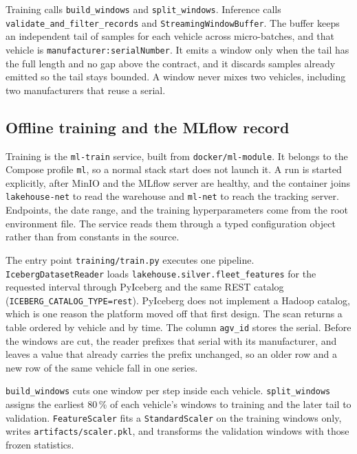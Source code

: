 Training calls \texttt{build\_windows} and \texttt{split\_windows}. Inference calls \texttt{validate\_and\_filter\_records} and \texttt{StreamingWindowBuffer}. The buffer keeps an independent tail of samples for each vehicle across micro-batches, and that vehicle is \texttt{manufacturer:serialNumber}. It emits a window only when the tail has the full length and no gap above the contract, and it discards samples already emitted so the tail stays bounded. A window never mixes two vehicles, including two manufacturers that reuse a serial.

\subsection{Offline training and the MLflow record}
\label{subsec:ml-training-implementation}

Training is the \texttt{ml-train} service, built from \texttt{docker/ml-module}. It belongs to the Compose profile \texttt{ml}, so a normal stack start does not launch it. A run is started explicitly, after MinIO and the MLflow server are healthy, and the container joins \texttt{lakehouse-net} to read the warehouse and \texttt{ml-net} to reach the tracking server. Endpoints, the date range, and the training hyperparameters come from the root environment file. The service reads them through a typed configuration object rather than from constants in the source.

The entry point \texttt{training/train.py} executes one pipeline. \texttt{IcebergDatasetReader} loads \texttt{lakehouse.silver.\allowbreak fleet\_features} for the requested interval through PyIceberg and the same REST catalog (\texttt{ICEBERG\_CATALOG\_TYPE=rest}). PyIceberg does not implement a Hadoop catalog, which is one reason the platform moved off that first design. The scan returns a table ordered by vehicle and by time. The column \texttt{agv\_id} stores the serial. Before the windows are cut, the reader prefixes that serial with its manufacturer, and leaves a value that already carries the prefix unchanged, so an older row and a new row of the same vehicle fall in one series.

\texttt{build\_windows} cuts one window per step inside each vehicle. \texttt{split\_windows} assigns the earliest 80\,\% of each vehicle's windows to training and the later tail to validation. \texttt{FeatureScaler} fits a \texttt{StandardScaler} on the training windows only, writes \texttt{artifacts/scaler.pkl}, and transforms the validation windows with those frozen statistics.

